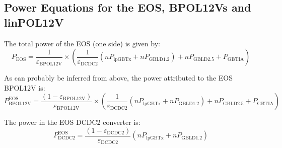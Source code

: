 
\subsection{Power Equations for the EOS, BPOL12Vs and linPOL12V}

The total power of the EOS (one side) is given by:
\begin{equation}
P_\text{EOS} = \frac{1}{\varepsilon_\text{BPOL12V}}\times
  \left( \frac{1}{\varepsilon_\text{DCDC2}} (n P_\text{lpGBTx} + n P_\text{GBLD1.2}) + n P_\text{GBLD2.5} + P_\text{GBTIA} \right)
\end{equation}

As can probably be inferred from above, the power attributed to the EOS BPOL12V is:
\begin{equation}
P^\text{EOS}_\text{BPOL12V} = \frac{(1-\varepsilon_\text{BPOL12V})}{\varepsilon_\text{BPOL12V}}\times
  \left( \frac{1}{\varepsilon_\text{DCDC2}} (n P_\text{lpGBTx} + n P_\text{GBLD1.2}) + n P_\text{GBLD2.5} + P_\text{GBTIA} \right)
\end{equation}

The power in the EOS DCDC2 converter is:
\begin{equation}
P^\text{EOS}_\text{DCDC2} = \frac{(1-\varepsilon_\text{DCDC2})}{\varepsilon_\text{DCDC2}} \left(n P_\text{lpGBTx} + n P_\text{GBLD1.2}\right)
\end{equation}


